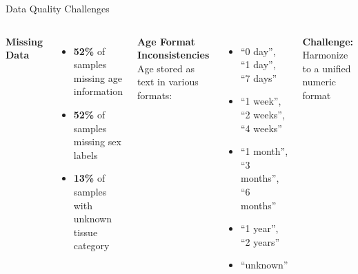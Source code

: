 \documentclass[aspectratio=169, 11pt, t]{beamer}
\newcommand{\cardiffHeading}[1]{\textcolor{CardiffBlack}{\fontsize{12}{15}\selectfont \textbf{#1}}}
\begin{document}
\begin{frame}{Data Quality Challenges}
    \vspace{0.3cm}
    \begin{columns}[T, onlytextwidth]
            \hspace{0.22cm}\cardiffHeading{Missing Data}
            \vspace{0.5em}
            \begin{itemize}
                \item \textbf{52\%} of samples missing age information
                \item \textbf{52\%} of samples missing sex labels
                \item \textbf{13\%} of samples with unknown tissue category
            \end{itemize}

            \cardiffHeading{Age Format Inconsistencies}
            \vspace{0.5em}
            {\small Age stored as text in various formats:}
            \vspace{0.3em}
            \begin{itemize}
                \item ``0 day'', ``1 day'', ``7 days''
                \item ``1 week'', ``2 weeks'', ``4 weeks''
                \item ``1 month'', ``3 months'', ``6 months''
                \item ``1 year'', ``2 years''
                \item ``unknown''
            \end{itemize}
            
            \vspace{0.3em}
            \begin{center}
                \color{CardiffRed}\textbf{Challenge:}\\
                \small Harmonize to a unified numeric format
            \end{center}
    \end{columns}
\end{frame}
\end{document}
